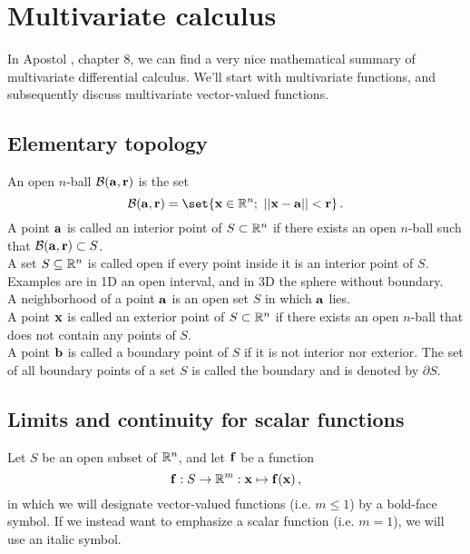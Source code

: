\section{Multivariate calculus}
    In Apostol \cite{Apostol1969}, chapter 8, we can find a very nice mathematical summary of multivariate differential calculus. We'll start with multivariate functions, and subsequently discuss multivariate vector-valued functions.

    \subsection{Elementary topology}
        An open $n$-ball $\mathcal{B}(\vb{a}, \vb{r})$ is the set
        \begin{equation}
            \mathcal{B}(\vb{a}, \vb{r}) = \set{\vb{x} \in \R^n ; \thinspace \thinspace||\vb{x} - \vb{a}|| < \vb{r}} \thinspace .
        \end{equation}
        A point $\vb{a}$ is called an interior point of $S \subset \mathbb{R}^n$ if there exists an open $n$-ball such that \mbox{$\mathcal{B}(\vb{a}, \vb{r}) \subset S$}. \\

        A set $S \subseteq \mathbb{R}^n$ is called open if every point inside it is an interior point of $S$. Examples are in 1D an open interval, and in 3D the sphere without boundary. \\

        A neighborhood of a point $\vb{a}$ is an open set $S$ in which $\vb{a}$ lies. \\

        A point $\vb{x}$ is called an exterior point of $S \subset \mathbb{R}^n$ if there exists an open $n$-ball that does not contain any points of $S$. \\

        A point $\vb{b}$ is called a boundary point of $S$ if it is not interior nor exterior. The set of all boundary points of a set $S$ is called the boundary and is denoted by $\partial S$.

    \subsection{Limits and continuity for scalar functions}
        Let $S$ be an open subset of $\mathbb{R}^n$, and let $\vb{f}$ be a function
        \begin{equation}
            \vb{f}: S \rightarrow \mathbb{R}^m: \vb{x} \mapsto \vb{f}(\vb{x}) \thinspace ,
        \end{equation}
        in which we will designate vector-valued functions (i.e. $m \leq 1$) by a bold-face symbol. If we instead want to emphasize a scalar function (i.e. $m=1$), we will use an italic symbol. \\

